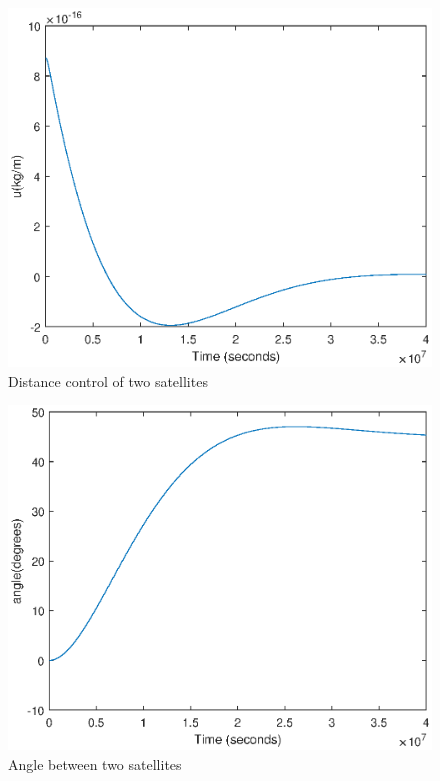 \begin{table}[H]
	\begin{minipage}[b]{0.49\linewidth}
		\centering
		\begin{figure}[H]
			\centering
			\includegraphics[width=1\linewidth]{figures/controller.eps}
			\caption{ Distance control of two satellites}
			\label{fig:distancecontrol}
		\end{figure}
	\end{minipage}\hfill
	\begin{minipage}[b]{0.49\linewidth}
		\centering
		\begin{figure}[H]
			\centering
			\includegraphics[width=1\linewidth]{figures/angle.eps}
			\caption{Angle between two satellites}
			\label{fig:distancecontrol2}
		\end{figure}
	\end{minipage}
\end{table}

